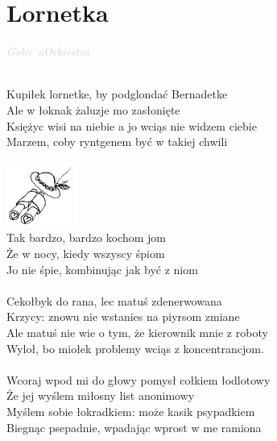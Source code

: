 \documentclass[a5paper, 10pt]{book}
\begin{document}
\newpage
\section{Lornetka}\textcolor{lightgray}{\textit{Golec uOrkiestra}}\\~\\
\begin{minipage}[t]{0.75\textwidth}
Kupiłek lornetke, by podglondać Bernadetke\\
Ale w łoknak żaluzje mo zasłonięte\\
Księżyc wisi na niebie a jo wciąs nie widzem ciebie\\
Marzem, coby ryntgenem być w takiej chwili\\
\\
\includegraphics[height=2cm, right]{images/lornetka.png}\vspace*{-2.05cm}\\
\hspace*{5mm}Tak bardzo, bardzo kochom jom\\
\hspace*{5mm}Że w nocy, kiedy wszyscy śpiom\\
\hspace*{5mm}Jo nie śpie, kombinując jak być z niom\\
\\
Cekołbyk do rana, lec matuś zdenerwowana\\
Krzycy: znowu nie wstanies na piyrsom zmiane\\
Ale matuś nie wie o tym, że kierownik mnie z roboty\\
Wyloł, bo miołek problemy wciąs z koncentrancjom.\\
\\
Wcoraj wpod mi do głowy pomysł cołkiem łodlotowy\\
Że jej wyślem miłosny list anonimowy\\
Myślem sobie łokradkiem: może kasik psypadkiem\\
Biegnąc psepadnie, wpadając wprost w me ramiona\\
\end{minipage}
\end{document}
